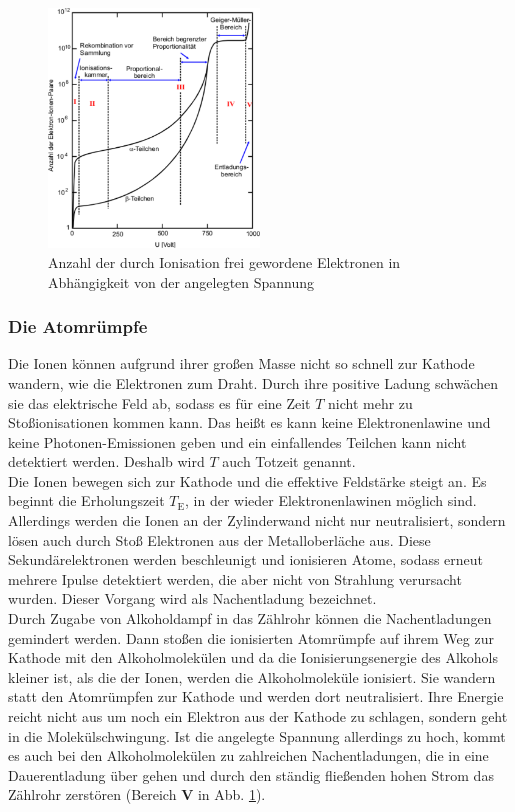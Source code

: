 \begin{figure}[h!]
	\centering
	\includegraphics[width=0.5\textwidth]{Spannungsabhangigkeit.pdf}
	\caption{Anzahl der durch Ionisation frei gewordene Elektronen in Abhängigkeit von der angelegten Spannung}
	\label{fig:DependenceVoltage}
\end{figure}
\subsubsection*{Die Atomrümpfe}
Die Ionen können aufgrund ihrer großen Masse nicht so schnell zur Kathode wandern, wie die Elektronen zum Draht. Durch ihre positive Ladung schwächen sie das elektrische Feld ab, sodass es für eine Zeit $T$ nicht mehr zu Stoßionisationen kommen kann. Das heißt es kann keine Elektronenlawine und keine Photonen-Emissionen geben und ein einfallendes Teilchen kann nicht detektiert werden. Deshalb wird $T$ auch Totzeit genannt. \\
Die Ionen bewegen sich zur Kathode und die effektive Feldstärke steigt an. Es beginnt die Erholungszeit $T_\text{E}$, in der wieder Elektronenlawinen möglich sind. Allerdings werden die Ionen an der Zylinderwand nicht nur neutralisiert, sondern lösen auch durch Stoß Elektronen aus der Metalloberläche aus. Diese Sekundärelektronen werden beschleunigt und ionisieren Atome, sodass erneut mehrere Ipulse detektiert werden, die aber nicht von Strahlung verursacht wurden. Dieser Vorgang wird als Nachentladung bezeichnet. \\
Durch Zugabe von Alkoholdampf in das Zählrohr können die Nachentladungen gemindert werden. Dann stoßen die ionisierten Atomrümpfe auf ihrem Weg zur Kathode mit den Alkoholmolekülen und da die Ionisierungsenergie des Alkohols kleiner ist, als die der Ionen, werden die Alkoholmoleküle ionisiert. Sie wandern statt den Atomrümpfen zur Kathode und werden dort neutralisiert. Ihre Energie reicht nicht aus um noch ein Elektron aus der Kathode zu schlagen, sondern geht in die Molekülschwingung. Ist die angelegte Spannung allerdings zu hoch, kommt es auch bei den Alkoholmolekülen zu zahlreichen Nachentladungen, die in eine Dauerentladung über gehen und durch den ständig fließenden hohen Strom das Zählrohr zerstören (Bereich \textbf{V} in Abb. \ref{fig:DependenceVoltage}).
